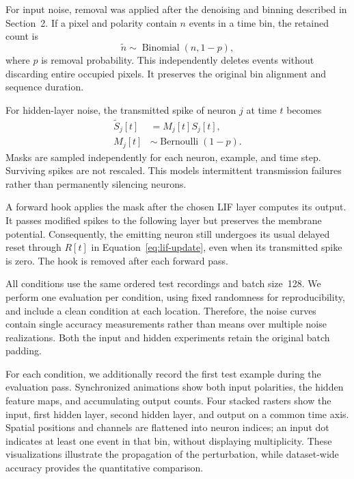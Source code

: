 For input noise, removal was applied after the denoising and binning described in Section~2. If a pixel and polarity contain $n$ events in a time bin, the retained count is
\begin{equation}
    \widetilde{n}\sim\operatorname{Binomial}(n,1-p),
\end{equation}
where $p$ is removal probability. This independently deletes events without discarding entire occupied pixels. It preserves the original bin alignment and sequence duration.

For hidden-layer noise, the transmitted spike of neuron $j$ at time $t$ becomes
\begin{equation}
    \begin{aligned}
        \widetilde{S}_{j}[t] &= M_j[t]S_j[t],\\
        M_j[t] &\sim \operatorname{Bernoulli}(1-p).
    \end{aligned}
\end{equation}
Masks are sampled independently for each neuron, example, and time step. Surviving spikes are not rescaled. This models intermittent transmission failures rather than permanently silencing neurons.

A forward hook applies the mask after the chosen LIF layer computes its output. It passes modified spikes to the following layer but preserves the membrane potential. Consequently, the emitting neuron still undergoes its usual delayed reset through $R[t]$ in Equation~\eqref{eq:lif-update}, even when its transmitted spike is zero. The hook is removed after each forward pass.

All conditions use the same ordered test recordings and batch size~128. We perform one evaluation per condition, using fixed randomness for reproducibility, and include a clean condition at each location. Therefore, the noise curves contain single accuracy measurements rather than means over multiple noise realizations. Both the input and hidden experiments retain the original batch padding.

For each condition, we additionally record the first test example during the evaluation pass. Synchronized animations show both input polarities, the hidden feature maps, and accumulating output counts. Four stacked rasters show the input, first hidden layer, second hidden layer, and output on a common time axis. Spatial positions and channels are flattened into neuron indices; an input dot indicates at least one event in that bin, without displaying multiplicity. These visualizations illustrate the propagation of the perturbation, while dataset-wide accuracy provides the quantitative comparison.
